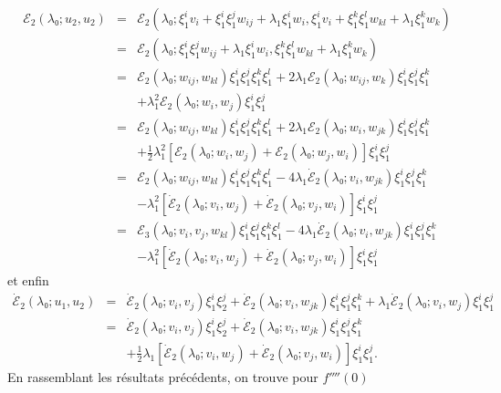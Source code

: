 \documentclass{article}
\begin{document}
\begin{eqnarray*}
  ℰ_2 (λ₀ ; u_2, u_2) & = & ℰ_2 (λ₀ ;
  ξ_1^i v_i + ξ_1^i ξ_1^j w_{i  j} + λ_1 ξ_1^i w_i,
  ξ_1^i v_i + ξ_1^k ξ_1^l w_{k  l} + λ_1 ξ_1^k w_k)\\
  & = & ℰ_2 (λ₀ ; ξ_1^i ξ_1^j w_{i  j} +
  λ_1 ξ_1^i w_i, ξ_1^k ξ_1^l w_{k  l} + λ_1 ξ_1^k
  w_k)\\
  & = & ℰ_2 (λ₀ ; w_{i  j}, w_{k  l})
  ξ_1^i ξ_1^j ξ_1^k ξ_1^l + 2 λ_1 ℰ_2 (λ₀ ;
  w_{i  j}, w_k) ξ_1^i ξ_1^j ξ_1^k\\
  &  &  + λ_1^2 ℰ_2 (λ₀ ; w_i, w_j) ξ_1^i
  ξ_1^j\\
  & = & ℰ_2 (λ₀ ; w_{i  j}, w_{k  l})
  ξ_1^i ξ_1^j ξ_1^k ξ_1^l + 2 λ_1 ℰ_2 (λ₀ ;
  w_i, w_{j  k}) ξ_1^i ξ_1^j ξ_1^k\\
  &  &  + \tfrac{1}{2} λ_1^2  [ℰ_2 (λ₀ ; w_i,
  w_j) +ℰ_2 (λ₀ ; w_j, w_i)] ξ_1^i ξ_1^j\\
  & = & ℰ_2 (λ₀ ; w_{i  j}, w_{k  l})
  ξ_1^i ξ_1^j ξ_1^k ξ_1^l - 4 λ_1  \dot{ℰ}_2
  (λ₀ ; v_i, w_{j  k}) ξ_1^i ξ_1^j ξ_1^k\\
  &  &  - λ_1^2  [\dot{ℰ}_2 (λ₀ ; v_i, w_j) +
  \dot{ℰ}_2 (λ₀ ; v_j, w_i)] ξ_1^i ξ_1^j\\
  & = & ℰ_3 (λ₀ ; v_i, v_j, w_{k  l}) ξ_1^i
  ξ_1^j ξ_1^k ξ_1^l - 4 λ_1  \dot{ℰ}_2 (λ₀ ; v_i,
  w_{j  k}) ξ_1^i ξ_1^j ξ_1^k\\
  &  &  - λ_1^2  [\dot{ℰ}_2 (λ₀ ; v_i, w_j) +
  \dot{ℰ}_2 (λ₀ ; v_j, w_i)] ξ_1^i ξ_1^j
\end{eqnarray*}
et enfin
\begin{eqnarray*}
  \dot{ℰ}_2 (λ₀ ; u_1, u_2) & = & \dot{ℰ}_2
  (λ₀ ; v_i, v_j) ξ_1^i ξ_2^j + \dot{ℰ}_2 (λ₀ ;
  v_i, w_{j  k}) ξ_1^i ξ_1^j ξ_1^k + λ_1
  \dot{ℰ}_2 (λ₀ ; v_i, w_j) ξ_1^i ξ_1^j\\
  & = & \dot{ℰ}_2 (λ₀ ; v_i, v_j) ξ_1^i ξ_2^j +
  \dot{ℰ}_2 (λ₀ ; v_i, w_{j  k}) ξ_1^i ξ_1^j
  ξ_1^k\\
  &  &  + \tfrac{1}{2} λ_1  [\dot{ℰ}_2 (λ₀ ;
  v_i, w_j) + \dot{ℰ}_2 (λ₀ ; v_j, w_i)] ξ_1^i ξ_1^j .
\end{eqnarray*}
En rassemblant les résultats précédents, on trouve pour $f''''
(0)$
\end{document}
